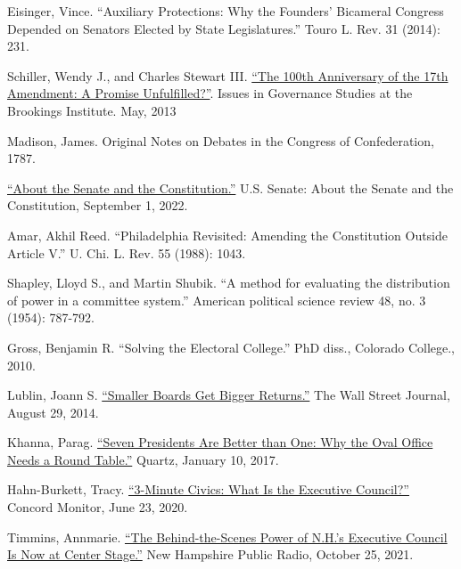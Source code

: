 \documentclass{article}
\newcommand{\quotes}[1]{``#1''}
\begin{document}
\begin{thebibliography}{20}
Eisinger, Vince. \quotes{Auxiliary Protections: Why the Founders' Bicameral Congress Depended on Senators Elected by State Legislatures.} Touro L. Rev. 31 (2014): 231.

Schiller, Wendy J., and Charles Stewart III. \href{https://www.brookings.edu/wp-content/uploads/2016/06/Schiller_17th-Amendment_v7.pdf}{\quotes{The 100th Anniversary of the 17th Amendment: A Promise Unfulfilled?}}. Issues in Governance Studies at the Brookings Institute. May, 2013

Madison, James. Original Notes on Debates in the Congress of Confederation, 1787.

\href{https://www.senate.gov/about/origins-foundations/senate-and-constitution.htm}{\quotes{About the Senate and the Constitution.}} U.S. Senate: About the Senate and the Constitution, September 1, 2022.

Amar, Akhil Reed. \quotes{Philadelphia Revisited: Amending the Constitution Outside Article V.} U. Chi. L. Rev. 55 (1988): 1043.

Shapley, Lloyd S., and Martin Shubik. \quotes{A method for evaluating the distribution of power in a committee system.} American political science review 48, no. 3 (1954): 787-792.

Gross, Benjamin R. \quotes{Solving the Electoral College.} PhD diss., Colorado College., 2010.

Lublin, Joann S. \href{https://www.wsj.com/articles/smaller-boards-get-bigger-returns-1409078628}{\quotes{Smaller Boards Get Bigger Returns.}} The Wall Street Journal, August 29, 2014. 

Khanna, Parag. \href{https://qz.com/876260/seven-presidents-are-better-than-one-why-the-oval-office-needs-a-round-table}{\quotes{Seven Presidents Are Better than One: Why the Oval Office Needs a Round Table.}} Quartz, January 10, 2017.

Hahn-Burkett, Tracy. \href{https://www.concordmonitor.com/What-is-the-Executive-Council-34817477}{\quotes{3-Minute Civics: What Is the Executive Council?}} Concord Monitor, June 23, 2020.

Timmins, Annmarie. \href{https://www.nhpr.org/nh-news/2021-10-25/executive-council}{\quotes{The Behind-the-Scenes Power of N.H.’s Executive Council Is Now at Center Stage.}} New Hampshire Public Radio, October 25, 2021. 


\end{thebibliography}
\end{document}
